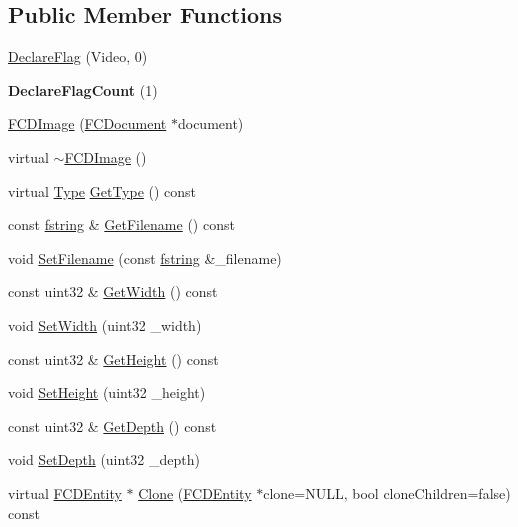 \subsection*{Public Member Functions}
\begin{DoxyCompactItemize}
\item 
\hyperlink{classFCDImage_a7bf618522edeefdcca908654299f2926}{DeclareFlag} (Video, 0)
\item 
\hypertarget{classFCDImage_a2d1207ec1294ed5f1fc5b6811e34a005}{
{\bfseries DeclareFlagCount} (1)}
\label{classFCDImage_a2d1207ec1294ed5f1fc5b6811e34a005}

\item 
\hyperlink{classFCDImage_ad5beb271aca9f1d566f0370dd06df0e0}{FCDImage} (\hyperlink{classFCDocument}{FCDocument} $\ast$document)
\item 
virtual \hyperlink{classFCDImage_a1883486f37fb68501cff879df759372e}{$\sim$FCDImage} ()
\item 
virtual \hyperlink{classFCDEntity_a9301a4bd5f4d4190ec13e40db4effdd7}{Type} \hyperlink{classFCDImage_a137caaacfc6ee0f82a4f654e142f23ea}{GetType} () const 
\item 
const \hyperlink{classfm_1_1stringT}{fstring} \& \hyperlink{classFCDImage_a6858c945bf5d58a4ce59162bdab1875a}{GetFilename} () const 
\item 
void \hyperlink{classFCDImage_a9489bc2214865330b82029f949ceedf7}{SetFilename} (const \hyperlink{classfm_1_1stringT}{fstring} \&\_\-filename)
\item 
const uint32 \& \hyperlink{classFCDImage_a9ff868bc5bcf26c3c861844522dd93d9}{GetWidth} () const 
\item 
void \hyperlink{classFCDImage_a1b095ed4b987f695fc4b742d4c4cfb5e}{SetWidth} (uint32 \_\-width)
\item 
const uint32 \& \hyperlink{classFCDImage_ad39e605dd085356561da4b407434a6ba}{GetHeight} () const 
\item 
void \hyperlink{classFCDImage_aff423a44ea5f473505efc3e35773e980}{SetHeight} (uint32 \_\-height)
\item 
const uint32 \& \hyperlink{classFCDImage_a120503567eb788e5000a4d19bfd46f16}{GetDepth} () const 
\item 
void \hyperlink{classFCDImage_abb4f63a3f2e886ad6bacb9be0ebab2d5}{SetDepth} (uint32 \_\-depth)
\item 
virtual \hyperlink{classFCDEntity}{FCDEntity} $\ast$ \hyperlink{classFCDImage_a9d01548f390bc703560b1ccaee569464}{Clone} (\hyperlink{classFCDEntity}{FCDEntity} $\ast$clone=NULL, bool cloneChildren=false) const 
\end{DoxyCompactItemize}


